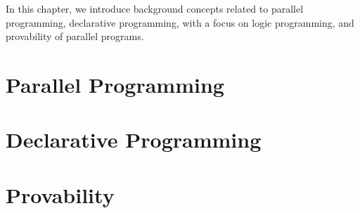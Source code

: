 In this chapter, we introduce background concepts related to parallel
programming, declarative programming, with a focus on logic programming, and
provability of parallel programs.

\section{Parallel Programming}


\section{Declarative Programming}\label{section:background:declarative}


\section{Provability}

